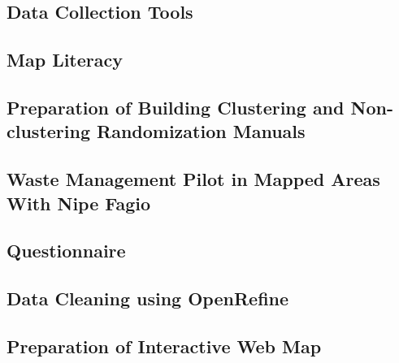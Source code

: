 \documentclass[a4paper,12pt,twoside]{article}
\begin{document}
\subsection{Data Collection Tools}

    \begin{multicols}{2}
    \lipsum[0-5]
    \end{multicols}

\subsection{Map Literacy}

    \begin{multicols}{2}
    \lipsum[0-5]
    \end{multicols}

\subsection{Preparation of Building Clustering and Non-clustering Randomization Manuals}

    \begin{multicols}{2}
    \lipsum[0-5]
    \end{multicols}

\subsection{Waste Management Pilot in Mapped Areas With Nipe Fagio}

    \begin{multicols}{2}
    \lipsum[0-5]
    \end{multicols}

\subsection{Questionnaire}

    \begin{multicols}{2}
    \lipsum[0-5]
    \end{multicols}

\subsection{Data Cleaning using OpenRefine}

    \begin{multicols}{2}
    \lipsum[0-5]
    \end{multicols}

\subsection{Preparation of Interactive Web Map}
\end{document}
